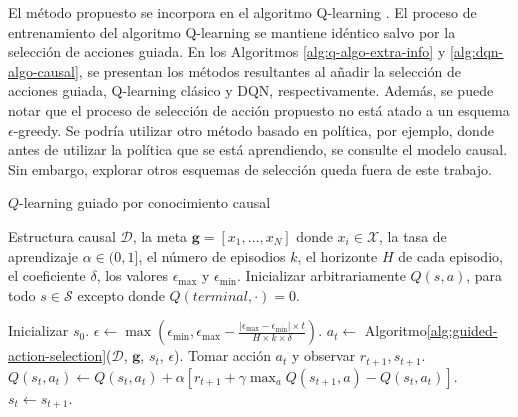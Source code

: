 

El método propuesto se incorpora en el algoritmo Q-learning \cite{watkins1992q}. El proceso de entrenamiento 
 del algoritmo Q-learning se mantiene idéntico salvo por  la selección de acciones guiada.
En los Algoritmos
\ref{alg:q-algo-extra-info} y \ref{alg:dqn-algo-causal}, se presentan los métodos resultantes al añadir la selección de acciones guiada, Q-learning clásico y DQN, respectivamente. Además, se puede notar que el proceso de selección de acción propuesto no está atado a un esquema $\epsilon$-greedy. Se podría utilizar otro método basado en política, por ejemplo, donde antes de utilizar la política que se está aprendiendo, se consulte el modelo causal. Sin embargo, explorar otros esquemas de selección queda fuera de este trabajo.

\begin{mialgoritmo}[H]
  	\caption{$Q$-learning guiado por conocimiento causal}
	\label{alg:q-algo-extra-info}
  \begin{algorithmic}[1]
  \REQUIRE Estructura causal $\mathcal{D}$, la meta $\mathbf{g} = [x_1, \dots, x_N]$ donde $x_i \in \mathcal{X}$, la tasa de aprendizaje $\alpha \in (0,1]$, el número de episodios $k$, el horizonte $H$ de cada episodio, el coeficiente $\delta$, los valores $\epsilon_{\max}$ y $\epsilon_{\min}$.
  \STATE Inicializar arbitrariamente $Q(s,a)$, para todo $s\in \mathcal{S}$ excepto donde $Q(terminal, \cdot) = 0$.
  
    \STATE Inicializar $s_0$.
    \STATE $\epsilon \leftarrow \max(\epsilon_{\min}, \epsilon_{\max} - \frac{|\epsilon_{\max} - \epsilon_{\min}| \times t}{H \times k \times \delta})$.
    \STATE $a_t \leftarrow$ Algoritmo\ref{alg:guided-action-selection}($\mathcal{D}$, $\mathbf{g}$, $s_t$, $\epsilon$).
    \STATE Tomar acción $a_t$ y observar $r_{t+1}, s_{t+1}$.
    \STATE $Q(s_t, a_t) \leftarrow Q(s_t, a_t) + \alpha [r_{t+1} + \gamma \max_a Q(s_{t+1}, a) - Q(s_t, a_t)]$.
    \STATE $s_t \leftarrow s_{t+1}$.
    \ENDFOR
  \ENDFOR
  \end{algorithmic}
\end{mialgoritmo}


